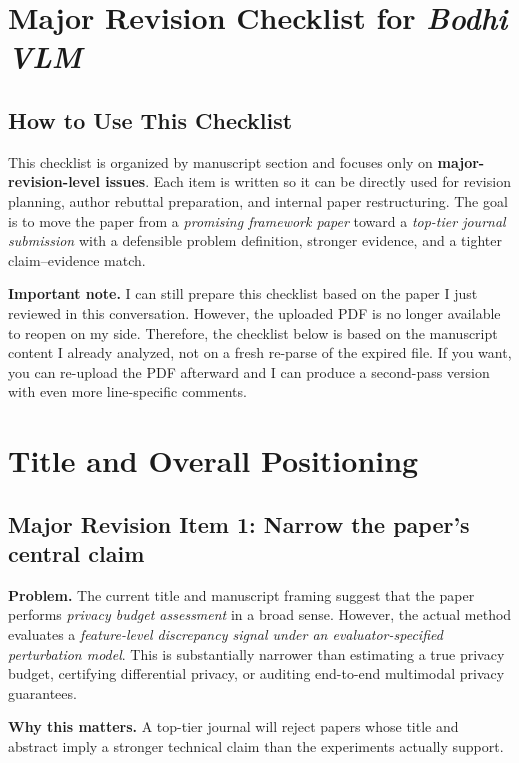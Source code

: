 \section*{Major Revision Checklist for \textit{Bodhi VLM}}

\subsection*{How to Use This Checklist}
This checklist is organized by manuscript section and focuses only on \textbf{major-revision-level issues}. Each item is written so it can be directly used for revision planning, author rebuttal preparation, and internal paper restructuring. The goal is to move the paper from a \emph{promising framework paper} toward a \emph{top-tier journal submission} with a defensible problem definition, stronger evidence, and a tighter claim--evidence match.

\bigskip

\noindent
\textbf{Important note.} I can still prepare this checklist based on the paper I just reviewed in this conversation. However, the uploaded PDF is no longer available to reopen on my side. Therefore, the checklist below is based on the manuscript content I already analyzed, not on a fresh re-parse of the expired file. If you want, you can re-upload the PDF afterward and I can produce a second-pass version with even more line-specific comments.

\section{Title and Overall Positioning}

\subsection*{Major Revision Item 1: Narrow the paper's central claim}
\textbf{Problem.} The current title and manuscript framing suggest that the paper performs \emph{privacy budget assessment} in a broad sense. However, the actual method evaluates a \emph{feature-level discrepancy signal under an evaluator-specified perturbation model}. This is substantially narrower than estimating a true privacy budget, certifying differential privacy, or auditing end-to-end multimodal privacy guarantees.

\textbf{Why this matters.} A top-tier journal will reject papers whose title and abstract imply a stronger technical claim than the experiments actually support.


